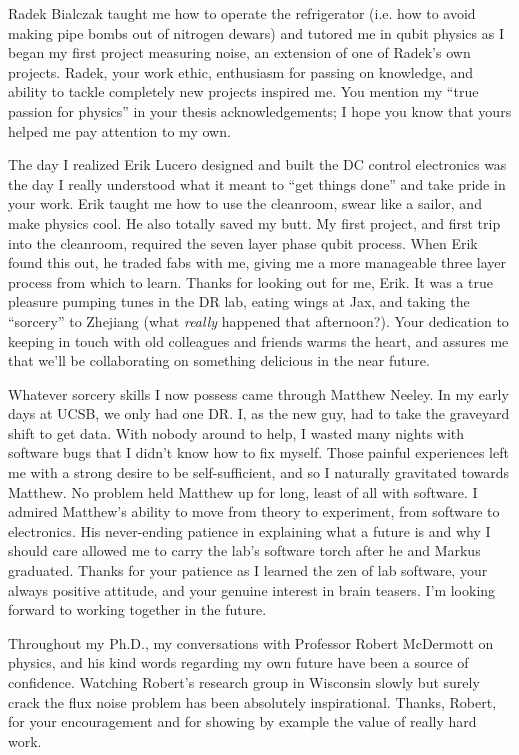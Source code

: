 \begin{acknowledgements}
Radek Bialczak taught me how to operate the refrigerator (i.e. how to avoid making pipe bombs out of nitrogen dewars) and tutored me in qubit physics as I began my first project measuring noise, an extension of one of Radek's own projects.
Radek, your work ethic, enthusiasm for passing on knowledge, and ability to tackle completely new projects inspired me.
You mention my ``true passion for physics'' in your thesis acknowledgements; I hope you know that yours helped me pay attention to my own.

The day I realized Erik Lucero designed and built the DC control electronics was the day I really understood what it meant to ``get things done'' and take pride in your work.
Erik taught me how to use the cleanroom, swear like a sailor, and make physics cool.
He also totally saved my butt.
My first project, and first trip into the cleanroom, required the seven layer phase qubit process.
When Erik found this out, he traded fabs with me, giving me a more manageable three layer process from which to learn.
Thanks for looking out for me, Erik.
It was a true pleasure pumping tunes in the DR lab, eating wings at Jax, and taking the ``sorcery'' to Zhejiang (what \emph{really} happened that afternoon?).
Your dedication to keeping in touch with old colleagues and friends warms the heart, and assures me that we'll be collaborating on something delicious in the near future.

Whatever sorcery skills I now possess came through Matthew Neeley.
In my early days at UCSB, we only had one DR.
I, as the new guy, had to take the graveyard shift to get data.
With nobody around to help, I wasted many nights with software bugs that I didn't know how to fix myself.
Those painful experiences left me with a strong desire to be self-sufficient, and so I naturally gravitated towards Matthew.
No problem held Matthew up for long, least of all with software.
I admired Matthew's ability to move from theory to experiment, from software to electronics.
His never-ending patience in explaining what a future is and why I should care allowed me to carry the lab's software torch after he and Markus graduated.
Thanks for your patience as I learned the zen of lab software, your always positive attitude, and your genuine interest in brain teasers.
I'm looking forward to working together in the future.

Throughout my Ph.D., my conversations with Professor Robert McDermott on physics, and his kind words regarding my own future have been a source of confidence.
Watching Robert's research group in Wisconsin slowly but surely crack the flux noise problem has been absolutely inspirational.
Thanks, Robert, for your encouragement and for showing by example the value of really hard work.


\end{acknowledgements}
